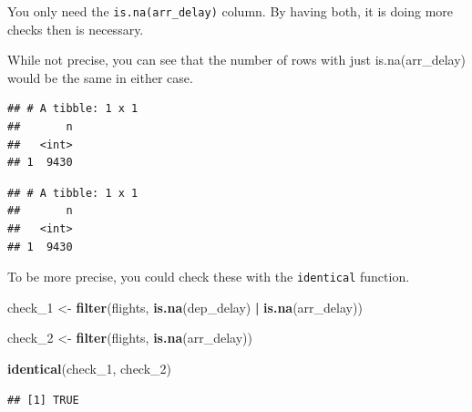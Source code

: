 \documentclass[]{book}
\newenvironment{Shaded}{\begin{snugshade}}{\end{snugshade}}
\newcommand{\DecValTok}[1]{\textcolor[rgb]{0.00,0.00,0.81}{#1}}
\newcommand{\KeywordTok}[1]{\textcolor[rgb]{0.13,0.29,0.53}{\textbf{#1}}}
\newcommand{\NormalTok}[1]{#1}
\newcommand{\OperatorTok}[1]{\textcolor[rgb]{0.81,0.36,0.00}{\textbf{#1}}}
\newcommand{\StringTok}[1]{\textcolor[rgb]{0.31,0.60,0.02}{#1}}
\theoremstyle{definition}
\theoremstyle{definition}
\theoremstyle{definition}
\theoremstyle{remark}
\begin{document}
You only need the \texttt{is.na(arr\_delay)} column. By having both, it
is doing more checks then is necessary.

While not precise, you can see that the number of rows with just
is.na(arr\_delay) would be the same in either case.

\begin{Shaded}
\end{Shaded}

\begin{verbatim}
## # A tibble: 1 x 1
##       n
##   <int>
## 1  9430
\end{verbatim}

\begin{Shaded}
\end{Shaded}

\begin{verbatim}
## # A tibble: 1 x 1
##       n
##   <int>
## 1  9430
\end{verbatim}

To be more precise, you could check these with the \texttt{identical}
function.

\begin{Shaded}
\begin{Highlighting}[]
\NormalTok{check_}\DecValTok{1}\NormalTok{ <-}\StringTok{ }\KeywordTok{filter}\NormalTok{(flights, }\KeywordTok{is.na}\NormalTok{(dep_delay) }\OperatorTok{|}\StringTok{ }\KeywordTok{is.na}\NormalTok{(arr_delay))}

\NormalTok{check_}\DecValTok{2}\NormalTok{ <-}\StringTok{ }\KeywordTok{filter}\NormalTok{(flights, }\KeywordTok{is.na}\NormalTok{(arr_delay))}

\KeywordTok{identical}\NormalTok{(check_}\DecValTok{1}\NormalTok{, check_}\DecValTok{2}\NormalTok{)}
\end{Highlighting}
\end{Shaded}

\begin{verbatim}
## [1] TRUE
\end{verbatim}
\end{document}
